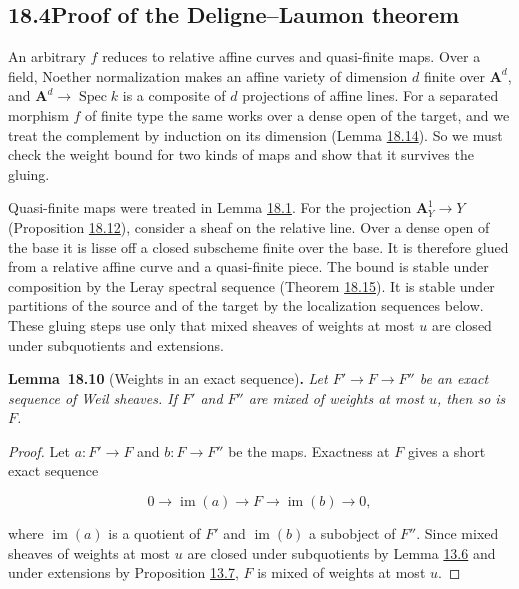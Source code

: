 \documentclass[11pt]{article}
\newenvironment{bpstatement}[2]{\par\addvspace{0.6\baselineskip}\noindent\textbf{#1}#2\textbf{.}\enspace\ignorespaces}
  {\par\addvspace{0.4\baselineskip}}
\newenvironment{bpstatementit}[2]{\begin{bpstatement}{#1}{#2}\itshape\ignorespaces}{\end{bpstatement}}
\begin{document}
\subsection*{\texorpdfstring{18.4\quad Proof of the Deligne–Laumon theorem}{18.4 Proof of the Deligne–Laumon theorem}}
\label{bp301}%
\label{bp302}%
An arbitrary \(f\) reduces to relative affine curves and quasi-finite maps. Over a field, Noether normalization makes an affine variety of dimension \(d\) finite over \(\mathbf A^d\), and \(\mathbf A^d\to\operatorname{Spec}k\) is a composite of \(d\) projections of affine lines. For a separated morphism \(f\) of finite type the same works over a dense open of the target, and we treat the complement by induction on its dimension (Lemma \hyperref[bp312]{18.14}). So we must check the weight bound for two kinds of maps and show that it survives the gluing.

Quasi-finite maps were treated in Lemma \hyperref[bp275]{18.1}. For the projection \(\mathbf A^1_Y\to Y\) (Proposition \hyperref[bp308]{18.12}), consider a sheaf on the relative line. Over a dense open of the base it is lisse off a closed subscheme finite over the base. It is therefore glued from a relative affine curve and a quasi-finite piece. The bound is stable under composition by the Leray spectral sequence (Theorem \hyperref[bp315]{18.15}). It is stable under partitions of the source and of the target by the localization sequences below. These gluing steps use only that mixed sheaves of weights at most \(u\) are closed under subquotients and extensions.

\label{bp303}%
\begin{bpstatementit}{Lemma~18.10}{ (Weights in an exact sequence)}
Let \(F'\to F\to F''\) be an exact sequence of Weil sheaves. If \(F'\) and \(F''\) are mixed of weights at most \(u\), then so is \(F\).
\end{bpstatementit}

\begin{proof}[{Proof}]\label{bp304}%
Let \(a:F'\to F\) and \(b:F\to F''\) be the maps. Exactness at \(F\) gives a short exact sequence

\[
0\to\operatorname{im}(a)\to F\to\operatorname{im}(b)\to0,
\]

where \(\operatorname{im}(a)\) is a quotient of \(F'\) and \(\operatorname{im}(b)\) a subobject of \(F''\). Since mixed sheaves of weights at most \(u\) are closed under subquotients by Lemma \hyperref[bp22]{13.6} and under extensions by Proposition \hyperref[bp24]{13.7}, \(F\) is mixed of weights at most \(u\).
\end{proof}
\end{document}
